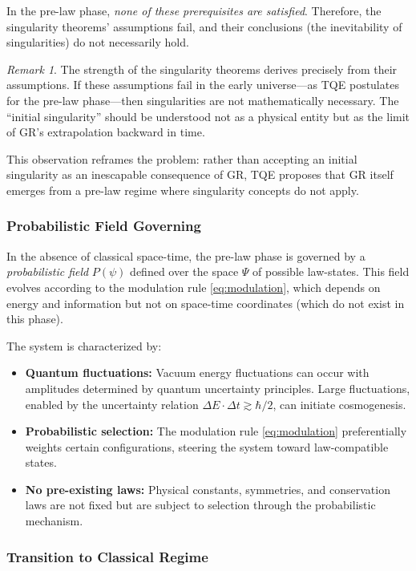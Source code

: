 \documentclass[12pt,a4paper]{article}
\theoremstyle{definition}
\theoremstyle{remark}
\newtheorem{remark}{Remark}[section]
\begin{document}
In the pre-law phase, \emph{none of these prerequisites are satisfied}. Therefore, the singularity theorems' assumptions fail, and their conclusions (the inevitability of singularities) do not necessarily hold.

\begin{remark}
The strength of the singularity theorems derives precisely from their assumptions. If these assumptions fail in the early universe—as TQE postulates for the pre-law phase—then singularities are not mathematically necessary. The ``initial singularity'' should be understood not as a physical entity but as the limit of GR's extrapolation backward in time.
\end{remark}

This observation reframes the problem: rather than accepting an initial singularity as an inescapable consequence of GR, TQE proposes that GR itself emerges from a pre-law regime where singularity concepts do not apply.

\subsubsection{Probabilistic Field Governing}

In the absence of classical space-time, the pre-law phase is governed by a \emph{probabilistic field} $P(\psi)$ defined over the space $\Psi$ of possible law-states. This field evolves according to the modulation rule \eqref{eq:modulation}, which depends on energy and information but not on space-time coordinates (which do not exist in this phase).

The system is characterized by:
\begin{itemize}
\item \textbf{Quantum fluctuations:} Vacuum energy fluctuations can occur with amplitudes determined by quantum uncertainty principles. Large fluctuations, enabled by the uncertainty relation $\Delta E \cdot \Delta t \gtrsim \hbar/2$, can initiate cosmogenesis.
\item \textbf{Probabilistic selection:} The modulation rule \eqref{eq:modulation} preferentially weights certain configurations, steering the system toward law-compatible states.
\item \textbf{No pre-existing laws:} Physical constants, symmetries, and conservation laws are not fixed but are subject to selection through the probabilistic mechanism.
\end{itemize}

\subsubsection{Transition to Classical Regime}
\end{document}
